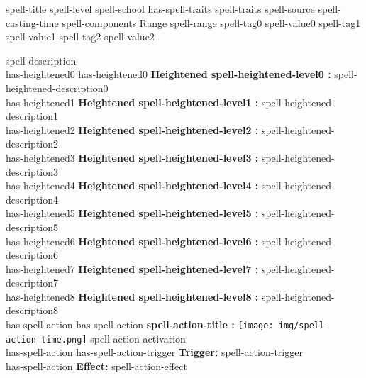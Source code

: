 \documentclass{article}
\begin{document}
\begin{spell}
{spell-title} %
{spell-level} %
{spell-school has-spell-traits spell-traits} %
{spell-source} %
{spell-casting-time} %
{spell-components} %
{Range} {spell-range}
{spell-tag0} {spell-value0}
{spell-tag1} {spell-value1}
{spell-tag2} {spell-value2}
    \begingroup
        \singlespacing
        \begin{singlespace*}
        \par\fontsize{spell-font-size}{10pt}\selectfont
        \vspace{7mm}   %
        spell-description\\
        
        has-heightened0 \vspace{2mm}
        has-heightened0 \textbf{Heightened spell-heightened-level0 :} spell-heightened-description0\\
        has-heightened1 \textbf{Heightened spell-heightened-level1 :} spell-heightened-description1\\
        has-heightened2 \textbf{Heightened spell-heightened-level2 :} spell-heightened-description2\\
        has-heightened3 \textbf{Heightened spell-heightened-level3 :} spell-heightened-description3\\
        has-heightened4 \textbf{Heightened spell-heightened-level4 :} spell-heightened-description4\\
        has-heightened5 \textbf{Heightened spell-heightened-level5 :} spell-heightened-description5\\
        has-heightened6 \textbf{Heightened spell-heightened-level6 :} spell-heightened-description6\\
        has-heightened7 \textbf{Heightened spell-heightened-level7 :} spell-heightened-description7\\
        has-heightened8 \textbf{Heightened spell-heightened-level8 :} spell-heightened-description8\\

        has-spell-action \vspace{2mm}
        has-spell-action \textbf{spell-action-title :} \texttt{[image: img/spell-action-time.png]} spell-action-activation\\
        has-spell-action has-spell-action-trigger \textbf{Trigger:} spell-action-trigger\\
        has-spell-action \textbf{Effect:} spell-action-effect\\


\end{singlespace*}
\end{spell}
\end{document}
